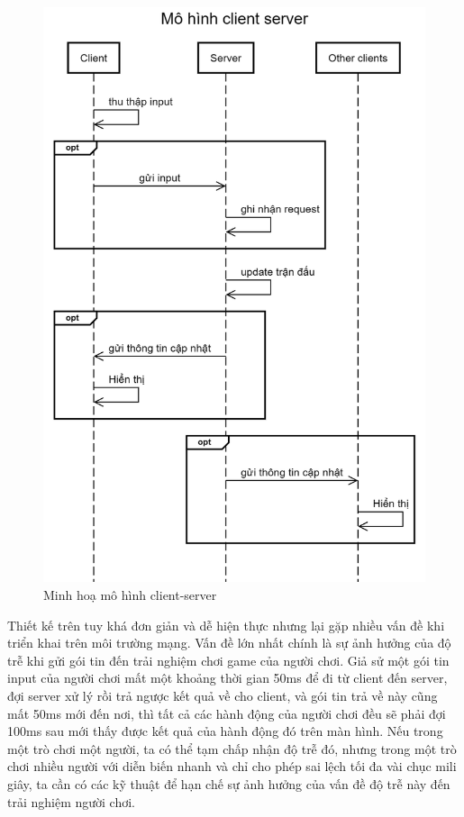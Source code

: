 \documentclass[12pt,a4paper]{article}
\begin{document}
  \begin{figure}[H]
  \centering
  \includegraphics[width=\textwidth,height=0.9\textheight,keepaspectratio]{Img/clientserver/Client-Server.png}
  \caption{Minh hoạ mô hình client-server}
  \end{figure}
  
  Thiết kế trên tuy khá đơn giản và dễ hiện thực nhưng lại gặp nhiều vấn đề khi triển khai trên môi trường mạng. Vấn đề lớn nhất chính là sự ảnh hưởng của độ trễ khi gửi gói tin đến trải nghiệm chơi game của người chơi. Giả sử một gói tin input của người chơi mất một khoảng thời gian 50ms để đi từ client đến server, đợi server xử lý rồi trả ngược kết quả về cho client, và gói tin trả về này cũng mất 50ms mới đến nơi, thì tất cả các hành động của người chơi đều sẽ phải đợi 100ms sau mới thấy được kết quả của hành động đó trên màn hình. Nếu trong một trò chơi một người, ta có thể tạm chấp nhận độ trễ đó, nhưng trong một trò chơi nhiều người với diễn biến nhanh và chỉ cho phép sai lệch tối đa vài chục mili giây, ta cần có các kỹ thuật để hạn chế sự ảnh hưởng của vấn đề độ trễ này đến trải nghiệm người chơi.
  
\end{document}

